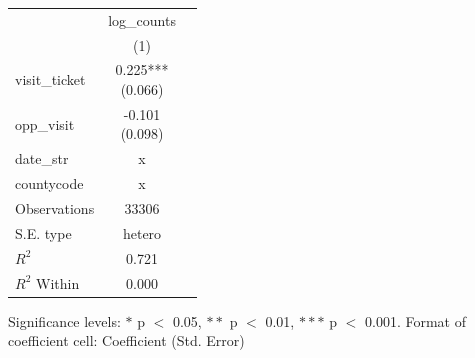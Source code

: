 \renewcommand\cellalign{t}
\begin{threeparttable}
\begin{tabular}{lcc}
\toprule
 & log_counts \\
 & (1) \\
\midrule
\addlinespace
visit_ticket & \makecell{0.225*** \\ (0.066)} \\
opp_visit & \makecell{-0.101 \\ (0.098)} \\
\midrule
\addlinespace
date_str & x \\
countycode & x \\
\midrule
\addlinespace
Observations & 33306 \\
S.E. type & hetero \\
$R^2$ & 0.721 \\
$R^2$ Within & 0.000 \\
\bottomrule
\end{tabular}
\footnotesize Significance levels: $*$ p $<$ 0.05, $**$ p $<$ 0.01, $***$ p $<$ 0.001. Format of coefficient cell: Coefficient 
 (Std. Error)
\end{threeparttable}